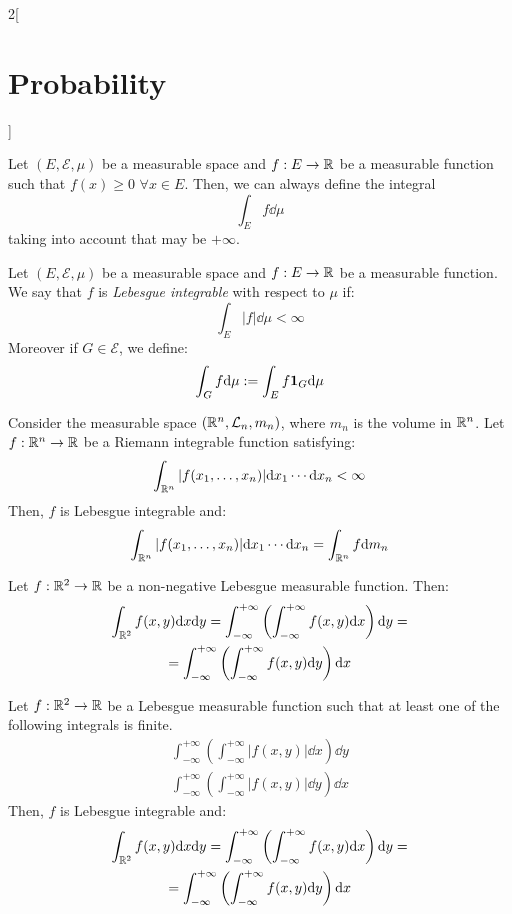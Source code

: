\documentclass[../../../main.tex]{subfiles}
\begin{document}
\begin{multicols}{2}[\section{Probability}]
\begin{definition}
  \end{definition}
  \begin{prop}
    Let $(E,\mathcal{E},\mu)$ be a measurable space and $f:E\rightarrow\mathbb{R}$ be a measurable function such that $f(x)\geq 0$ $\forall x\in E$. Then, we can always define the integral $$\int_Ef\dd\mu$$ taking into account that may be $+\infty$.
  \end{prop}
  \begin{definition}
    Let $(E,\mathcal{E},\mu)$ be a measurable space and $f:E\rightarrow\mathbb{R}$ be a measurable function. We say that $f$ is \textit{Lebesgue integrable} with respect to $\mu$ if: $$\int_E|f|\dd\mu<\infty$$
    Moreover if $G\in\mathcal{E}$, we define: $$\int_Gf\dd\mu:=\int_Ef\boldsymbol{\mathrm{1}}_G\dd\mu$$
  \end{definition}
  \begin{prop}
    Consider the measurable space $(\mathbb{R}^n,\mathcal{L}_n,m_n)$, where $m_n$ is the volume in $\mathbb{R}^n$. Let $f:\mathbb{R}^n\rightarrow\mathbb{R}$ be a Riemann integrable function satisfying: $$\int_{\mathbb{R}^n}|f(x_1,\ldots,x_n)|\dd x_1\cdots\dd x_n<\infty$$
    Then, $f$ is Lebesgue integrable and: $$\int_{\mathbb{R}^n}|f(x_1,\ldots,x_n)|\dd x_1\cdots\dd x_n=\int_{\mathbb{R}^n}f\dd m_n$$
  \end{prop}
  \begin{theorem}
    Let $f:\mathbb{R}^2\rightarrow\mathbb{R}$ be a non-negative Lebesgue measurable function. Then:
    \begin{multline*}
      \int_{\mathbb{R}^2}f(x,y)\dd x\dd y=\int_{-\infty}^{+\infty}\left(\int_{-\infty}^{+\infty}f(x,y)\dd x\right)\dd y=\\=\int_{-\infty}^{+\infty}\left(\int_{-\infty}^{+\infty}f(x,y)\dd y\right)\dd x
    \end{multline*}
  \end{theorem}
  \begin{theorem}
    Let $f:\mathbb{R}^2\rightarrow\mathbb{R}$ be a Lebesgue measurable function such that at least one of the following integrals is finite.
    \begin{gather*}
      \int_{-\infty}^{+\infty}\left(\int_{-\infty}^{+\infty}|f(x,y)|\dd x\right)\dd y\\
      \int_{-\infty}^{+\infty}\left(\int_{-\infty}^{+\infty}|f(x,y)|\dd y\right)\dd x
    \end{gather*}
    Then, $f$ is Lebesgue integrable and:
    \begin{multline*}
      \int_{\mathbb{R}^2}f(x,y)\dd x\dd y=\int_{-\infty}^{+\infty}\left(\int_{-\infty}^{+\infty}f(x,y)\dd x\right)\dd y=\\=\int_{-\infty}^{+\infty}\left(\int_{-\infty}^{+\infty}f(x,y)\dd y\right)\dd x
    \end{multline*}
  \end{theorem}

\end{multicols}
\end{document}
